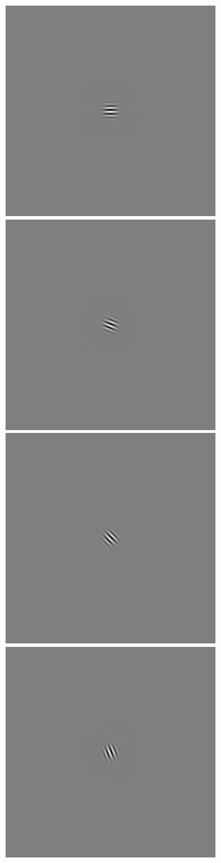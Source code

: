 \begin{figure}
\begin{center}
 \includegraphics[scale=0.1]{ch4/figures/rGabor0_4.jpg}
 \includegraphics[scale=0.1]{ch4/figures/rGabor0_5.jpg}
 \includegraphics[scale=0.1]{ch4/figures/rGabor0_6.jpg}
 \includegraphics[scale=0.1]{ch4/figures/rGabor0_7.jpg}\\

\end{center}
\end{figure}
